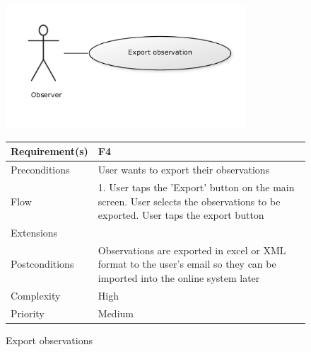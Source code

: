 \begin{figure}
		\centering
		\includegraphics[width=0.8\textwidth]{reqspec/uc/export.png}
		\caption{Export  observations}
		\label{fig:export}

\begin{tabular}[t]{|l|p{}|}\hline
	Requirement(s)&F4\\\hline
	Preconditions& User wants to export their observations \\\hline
	Flow&1. User taps the 'Export' button on the main screen\newline
	2. User selects the observations to be exported\newline
	3. User taps the export button\\\hline
	Extensions& \\\hline
	Postconditions&Observations are exported in excel or XML format to the user's email so they can be imported into the online system later\\\hline
	Complexity&High\\\hline
	Priority&Medium\\\hline
\end{tabular}
\end{figure}


\hspace{2em}


